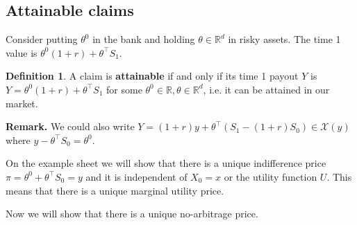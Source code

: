 \documentclass{article}
\theoremstyle{definition}
\newtheorem{defn}{Definition}[section]
\begin{document}
\subsection{Attainable claims}
Consider putting $\theta^0$ in the bank and holding $\theta \in \mathbb{R}^d$ in risky assets. The time 1 value is $\theta^0(1+r) + \theta^\top S_1$.
\begin{defn}
    A claim is \textbf{attainable} if and only if its time 1 payout $Y$ is $Y = \theta^0(1+r) + \theta^\top S_1$ for some $\theta^0 \in \mathbb{R}, \theta \in \mathbb{R}^d$, i.e. it can be attained in our market.
\end{defn}
\textbf{Remark.} We could also write $Y=(1+r)y + \theta^\top(S_1-(1+r)S_0) \in \mathcal{X}(y)$ where $y - \theta^\top S_0 = \theta^0$.

On the example sheet we will show that there is a unique indifference price $\pi = \theta^0 + \theta^\top S_0 = y$ and it is independent of $X_0 = x$ or the utility function $U$. This means that there is a unique marginal utility price.

Now we will show that there is a unique no-arbitrage price.
\end{document}
